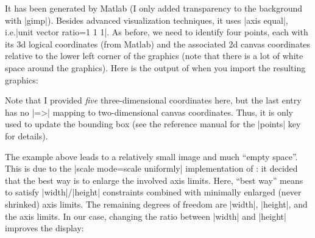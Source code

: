 {{It has been generated by Matlab (I only added transparency to the background
with |gimp|). Besides advanced visualization techniques, it uses |axis equal|,
i.e.\@ |unit vector ratio=1 1 1|. As before, we need to identify four points,
each with its 3d logical coordinates (from Matlab) and the associated 2d canvas
coordinates relative to the lower left corner of the graphics (note that there
is a lot of white space around the graphics). Here is the output of \PGFPlots{}
when you import the resulting graphics:
%
\begin{codeexample}[]
\end{codeexample}
%
\noindent Note that I provided \emph{five} three-dimensional coordinates here,
but the last entry has no |=>| mapping to two-dimensional canvas coordinates.
Thus, it is only used to update the bounding box (see the reference manual for
the |points| key for details).

The example above leads to a relatively small image and much ``empty space''.
This is due to the |scale mode=scale uniformly| implementation of \PGFPlots{}:
it decided that the best way is to enlarge the involved axis limits. Here,
``best way'' means to satisfy |width|/|height| constraints combined with
minimally enlarged (never shrinked) axis limits. The remaining degrees of
freedom are |width|, |height|, and the axis limits. In our case, changing the
ratio between |width| and |height| improves the display:

}}
